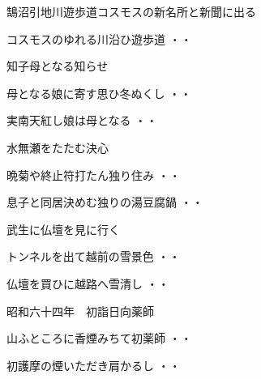 鵠沼引地川遊歩道コスモスの新名所と新聞に出る
\begin{shiika}コスモスのゆれる川沿ひ遊歩道
\hfill{・・}\end{shiika}
\vspace{0.6cm}
知子母となる知らせ
\begin{shiika}母となる娘に寄す思ひ冬ぬくし
\hfill{・・}\end{shiika}
\begin{shiika}実南天紅し娘は母となる
\hfill{・・}\end{shiika}
\vspace{0.6cm}
水無瀬をたたむ決心
\begin{shiika}晩菊や終止符打たん独り住み
\hfill{・・}\end{shiika}
\begin{shiika}息子と同居決めむ独りの湯豆腐鍋
\hfill{・・}\end{shiika}
\vspace{0.6cm}
武生に仏壇を見に行く
\begin{shiika}トンネルを出て越前の雪景色
\hfill{・・}\end{shiika}
\begin{shiika}仏壇を買ひに越路へ雪清し
\hfill{・・}\end{shiika}
\vspace{0.6cm}
昭和六十四年　初詣日向薬師
\begin{shiika}山ふところに香煙みちて初薬師
\hfill{・・}\end{shiika}
\begin{shiika}初護摩の煙いただき肩かるし
\hfill{・・}\end{shiika}
